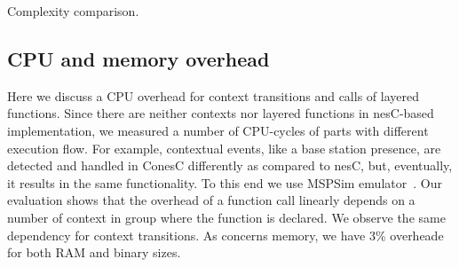 \begin{table}[!h]
\renewcommand{\arraystretch}{1.3}
\caption{Complexity comparison.}
\label{tab:compres}

\end{table}

\subsection{CPU and memory overhead}

Here we discuss a CPU overhead for context transitions and calls of layered
functions. Since there are neither contexts nor layered functions in nesC-based
implementation, we measured a number of CPU-cycles of parts with different
execution flow. For example, contextual events, like a base station presence,
are detected and handled in ConesC differently as compared to nesC, but,
eventually, it results in the same functionality. To this end we use MSPSim
emulator~\cite{eriksson09}. Our evaluation shows that the overhead of a function
call linearly depends on a number of context in group where the function is
declared. We observe the same dependency for context transitions. As concerns
memory, we have 3\% overheade for both RAM and binary sizes.
